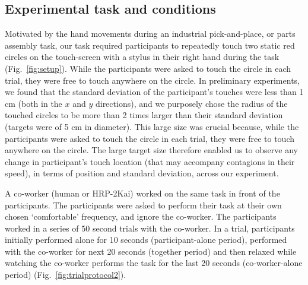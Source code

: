 \subsection{Experimental task and conditions}


Motivated by the hand movements during an industrial pick-and-place, or parts assembly task, our task required participants to repeatedly touch two static red circles on the touch-screen with a stylus in their right hand during the task (Fig.~\ref{fig:setup}). While the participants were asked to touch the circle in each trial, they were free to touch anywhere on the circle. In preliminary experiments, we found that the standard deviation of the participant's touches were less than 1 cm (both in the $x$ and $y$ directions), and we purposely chose the radius of the touched circles to be more than 2 times larger than their standard deviation (targets were of 5 cm in diameter). This large size was crucial because, while the participants were asked to touch the circle in each trial, they were free to touch anywhere on the circle. The large target size therefore enabled us to observe any change in participant's touch location (that may accompany contagions in their speed), in terms of position and standard deviation, across our experiment. 

A co-worker (human or HRP-2Kai) worked on the same task in front of the participants. The participants were asked to perform their task at their own chosen `comfortable' frequency, and ignore the co-worker. The participants worked in a series of 50 second trials with the co-worker. In a trial, participants initially performed alone for 10 seconds (participant-alone period), performed with the co-worker for next 20 seconds (together period) and then relaxed while watching the co-worker performs the task for the last 20 seconds (co-worker-alone period) (Fig.~\ref{fig:trialprotocol2}).   

